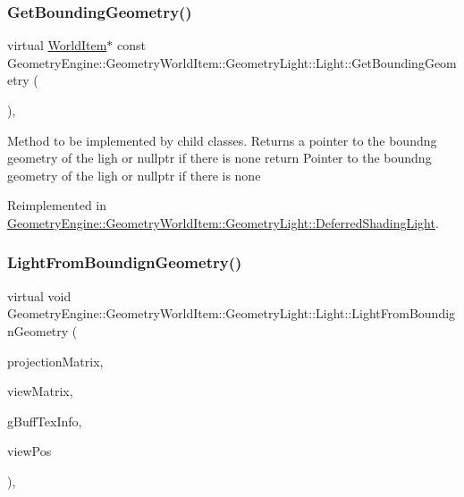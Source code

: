 \subsubsection{\texorpdfstring{GetBoundingGeometry()}{GetBoundingGeometry()}}
{\footnotesize\ttfamily virtual \mbox{\hyperlink{class_geometry_engine_1_1_geometry_world_item_1_1_world_item}{World\+Item}}$\ast$ const Geometry\+Engine\+::\+Geometry\+World\+Item\+::\+Geometry\+Light\+::\+Light\+::\+Get\+Bounding\+Geometry (\begin{DoxyParamCaption}{ }\end{DoxyParamCaption})\hspace{0.3cm}{\ttfamily [inline]}, {\ttfamily [virtual]}}

Method to be implemented by child classes. Returns a pointer to the boundng geometry of the ligh or nullptr if there is none return Pointer to the boundng geometry of the ligh or nullptr if there is none 

Reimplemented in \mbox{\hyperlink{class_geometry_engine_1_1_geometry_world_item_1_1_geometry_light_1_1_deferred_shading_light_a742416954d3b05484799e4c1235567b1}{Geometry\+Engine\+::\+Geometry\+World\+Item\+::\+Geometry\+Light\+::\+Deferred\+Shading\+Light}}.

\mbox{\label{class_geometry_engine_1_1_geometry_world_item_1_1_geometry_light_1_1_light_a4dfee4fc27c75493f992a84c2ea3ff95}} 
\subsubsection{\texorpdfstring{LightFromBoundignGeometry()}{LightFromBoundignGeometry()}}
{\footnotesize\ttfamily virtual void Geometry\+Engine\+::\+Geometry\+World\+Item\+::\+Geometry\+Light\+::\+Light\+::\+Light\+From\+Boundign\+Geometry (\begin{DoxyParamCaption}\item[{const Q\+Matrix4x4 \&}]{projection\+Matrix,  }\item[{const Q\+Matrix4x4 \&}]{view\+Matrix,  }\item[{const \mbox{\hyperlink{struct_geometry_engine_1_1_g_buffer_texture_info}{G\+Buffer\+Texture\+Info}} \&}]{g\+Buff\+Tex\+Info,  }\item[{const Q\+Vector3D \&}]{view\+Pos }\end{DoxyParamCaption})\hspace{0.3cm}{\ttfamily [inline]}, {\ttfamily [virtual]}}

